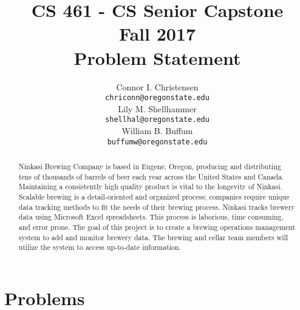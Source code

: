 \documentclass[draftclsnofoot,onecolumn,letterpaper,10pt]{IEEEtran}
\title{CS 461 - CS Senior Capstone
	\\Fall 2017
	\\Problem Statement
}
\author{
	Connor I. Christensen \\
	\texttt{chriconn@oregonstate.edu}
	\\
	Lily M. Shellhammer \\
	\texttt{shellhal@oregonstate.edu}
	\\
	William B. Buffum \\
	\texttt{buffumw@oregonstate.edu}
}
\begin{document}
\begin{titlingpage}
	\maketitle
	\begin{abstract}
		Ninkasi Brewing Company is based in Eugene, Oregon, producing and distributing tens of thousands of barrels of beer each year across the United States and Canada.
		Maintaining a consistently high quality product is vital to the longevity of Ninkasi.
		Scalable brewing is a detail-oriented and organized process; companies require unique data tracking methods to fit the needs of their brewing process.
		Ninkasi tracks brewery data using Microsoft Excel spreadsheets.
		This process is laborious, time consuming, and error prone.
		The goal of this project is to create a brewing operations management system to add and monitor brewery data.
		The brewing and cellar team members will utilize the system to access up-to-date information.
	\end{abstract}
	\pagebreak
	\tableofcontents
\end{titlingpage}

\section{Problems}
\end{document}
